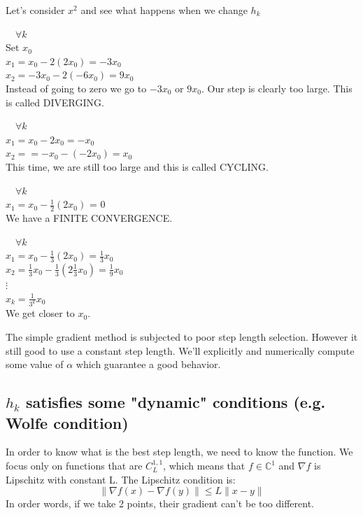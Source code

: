 \begin{example}\begin{leftbar}
Let's consider $x^2$ and see what happens when we change $h_k$

 $\quad \forall k$ \\
Set $x_0$ \\
$x_1 = x_0 - 2(2x_0) = -3x_0$\\
$x_2 = -3x_0 - 2(-6x_0) = 9 x_0$\\
Instead of going to zero we go to $-3x_0$ or $9x_0$. Our step is clearly too large. This is called DIVERGING.

 $\quad \forall k$ \\
$x_1 = x_0 - 2x_0 = -x_0$\\
$x_2 = = -x_0 - (-2x_0) = x_0$ \\
This time, we are still too large and this is called CYCLING. 

 $\quad \forall k$ \\
$x_1 = x_0 - \frac{1}{2}(2x_0)$ = 0 \\
We have a FINITE CONVERGENCE. 

 $\quad \forall k$ \\
$x_1 = x_0 - \frac{1}{3}(2x_0) = \frac{1}{3}x_0$\\
$x_2 = \frac{1}{3}x_0 - \frac{1}{3}(2\frac{1}{3}x_0) = \frac{1}{9}x_0$\\
$\vdots$\\
$x_k = \frac{1}{3^k}x_0$ \\

We get closer to $x_0$. 

\end{leftbar}\end{example}

The simple gradient method is subjected to poor step length selection. However it still good to use a constant step length. We'll explicitly and numerically compute some value of $\alpha$ which guarantee a good behavior. 

\subsection{$h_k$ satisfies some "dynamic" conditions (e.g. Wolfe condition)}

In order to know what is the best step length, we need to know the function. We focus only on functions that are $C_L^{1,1}$, which means that $f \in \mathbb{C}^1$ and $\nabla f$ is Lipschitz with constant L. The Lipschitz condition is:
$$\| \nabla f(x) - \nabla f(y) \| \leq L \| x-y \|$$
In order words, if we take 2 points, their gradient can't be too different. 

